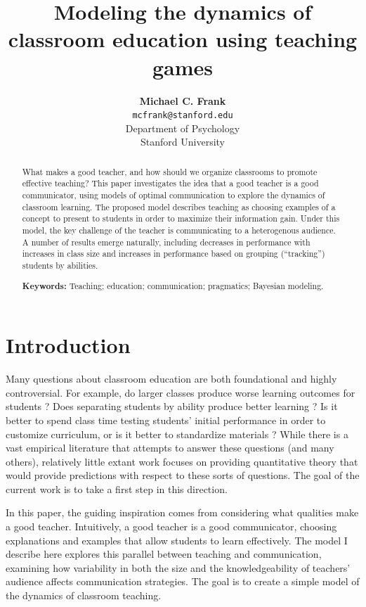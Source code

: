 \documentclass[10pt,letterpaper]{article}
\title{Modeling the dynamics of classroom education using teaching games}
\author{{\large \bf Michael C. Frank} \\
  \texttt{mcfrank@stanford.edu} \\
  Department of Psychology\\
  Stanford University}
\begin{document}
\maketitle

\begin{abstract}
What makes a good teacher, and how should we organize classrooms to promote effective teaching? This paper investigates the idea that a good teacher is a good communicator, using models of optimal communication to explore the dynamics of classroom learning. The proposed model describes teaching as choosing examples of a concept to present to students in order to maximize their information gain. Under this model, the key challenge of the teacher is communicating to a heterogenous audience. A number of results emerge naturally, including decreases in performance with increases in class size and increases in performance based on grouping (``tracking'') students by abilities.

\textbf{Keywords:} 
Teaching; education; communication; pragmatics; Bayesian modeling.
\end{abstract}

\section{Introduction}

Many questions about classroom education are both foundational and highly controversial. For example, do larger classes produce worse learning outcomes for students \cite{glass1979,slavin1989}? Does separating students by ability produce better learning \cite{slavin1987,wheelock1992}? Is it better to spend class time testing students' initial performance in order to customize curriculum, or is it better to standardize materials \cite{fuchs1986}? While there is a vast empirical literature that attempts to answer these questions (and many others), relatively little extant work focuses on providing quantitative theory that would provide predictions with respect to these sorts of questions. The goal of the current work is to take a first step in this direction.

In this paper, the guiding inspiration comes from considering what qualities make a good teacher. Intuitively, a good teacher is a good communicator, choosing explanations and examples that allow students to learn effectively. The model I describe here explores this parallel between teaching and communication, examining how variability in both the size and the knowledgeability of teachers' audience affects communication strategies. The goal is to create a simple model of the dynamics of classroom teaching. 
\end{document}

